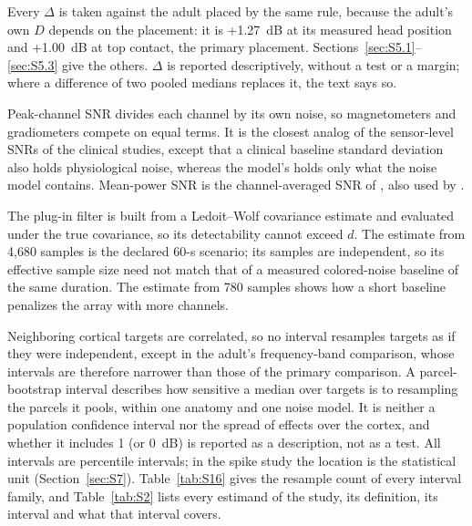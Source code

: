 \documentclass[preprint,12pt,authoryear,a4paper]{elsarticle}
\begin{document}
Every $\Delta$ is taken against the adult placed by the same rule, because the adult's own $D$ depends on the placement: it is +1.27~dB at its measured head position and +1.00~dB at top contact, the primary placement. Sections~\ref{sec:S5.1}--\ref{sec:S5.3} give the others. $\Delta$ is reported descriptively, without a test or a margin; where a difference of two pooled medians replaces it, the text says so.

Peak-channel SNR divides each channel by its own noise, so magnetometers and gradiometers compete on equal terms. It is the closest analog of the sensor-level SNRs of the clinical studies, except that a clinical baseline standard deviation also holds physiological noise, whereas the model's holds only what the noise model contains. Mean-power SNR is the channel-averaged SNR of \citet{goldenholz2009}, also used by \citet{matsubara2026}.

The plug-in filter is built from a Ledoit--Wolf covariance estimate \citep{ledoit2004} and evaluated under the true covariance, so its detectability cannot exceed $d$. The estimate from 4,680 samples is the declared 60-s scenario; its samples are independent, so its effective sample size need not match that of a measured colored-noise baseline of the same duration. The estimate from 780 samples shows how a short baseline penalizes the array with more channels.

Neighboring cortical targets are correlated, so no interval resamples targets as if they were independent, except in the adult's frequency-band comparison, whose intervals are therefore narrower than those of the primary comparison. A parcel-bootstrap interval describes how sensitive a median over targets is to resampling the parcels it pools, within one anatomy and one noise model. It is neither a population confidence interval nor the spread of effects over the cortex, and whether it includes 1 (or 0~dB) is reported as a description, not as a test. All intervals are percentile intervals; in the spike study the location is the statistical unit (Section~\ref{sec:S7}). Table~\ref{tab:S16} gives the resample count of every interval family, and Table~\ref{tab:S2} lists every estimand of the study, its definition, its interval and what that interval covers.
\end{document}
